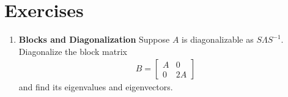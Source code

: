 \documentclass[../../linear_algebra.tex]{subfiles}
\begin{document}
\section{Exercises}
\begin{enumerate}
    \item \textbf{Blocks and Diagonalization}\newline
    Suppose $A$ is diagonalizable as $S \Lambda S^{-1}$. Diagonalize the block matrix
    \begin{align*}
        B = \begin{bmatrix}
            A &0\\ 0 &2A
        \end{bmatrix}
    \end{align*}
    and find its eigenvalues and eigenvectors.
\end{enumerate}
\end{document}
